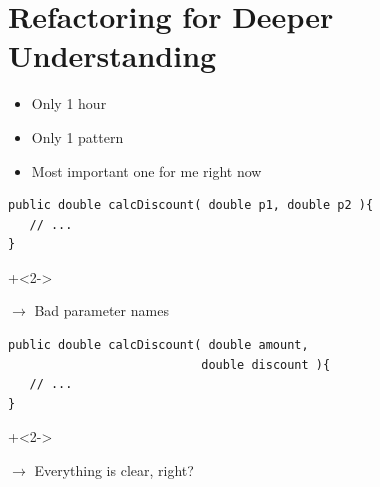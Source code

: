 \part{Refactoring for Deeper Understanding}

\begin{frame}[fragile]{}

\begin{itemize}
\item Only 1 hour
\item Only 1 pattern
\vspace{1em}
\item Most important one for me right now
\end{itemize}

\end{frame}



\begin{frame}[fragile]{}

\begin{lstlisting}
public double calcDiscount( double p1, double p2 ){
   // ...
}
\end{lstlisting}

\onslide+<2->

\vspace{2em}

$\longrightarrow$ Bad parameter names

\end{frame}

\begin{frame}[fragile]{}

\begin{lstlisting}
public double calcDiscount( double amount, 
                           double discount ){
   // ...
}
\end{lstlisting}

\onslide+<2->

\vspace{2em}

$\longrightarrow$ Everything is clear, right?

\end{frame}


